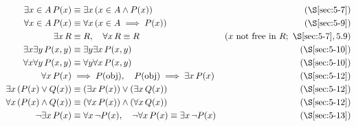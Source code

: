 \begin{note}
\begin{align*}
\exists x\in A\, P(x) &\equiv \exists x\,(x\in A \wedge P(x)) & \text{(\S\ref{sec:5-7})}\\
\forall x\in A\, P(x) &\equiv \forall x\,(x\in A \implies P(x)) & \text{(\S\ref{sec:5-9})}\\
\exists x\, R &\equiv R, \quad \forall x\, R \equiv R & (x \text{ not free in } R;\ \S\ref{sec:5-7},5.9)\\
\exists x\exists y\, P(x,y) &\equiv \exists y\exists x\, P(x,y) & \text{(\S\ref{sec:5-10})}\\
\forall x\forall y\, P(x,y) &\equiv \forall y\forall x\, P(x,y) & \text{(\S\ref{sec:5-10})}\\
\forall x\, P(x) &\implies P(\mathrm{obj}), \quad P(\mathrm{obj}) \implies \exists x\, P(x) & \text{(\S\ref{sec:5-12})}\\
\exists x\,(P(x)\vee Q(x)) &\equiv (\exists x\,P(x))\vee(\exists x\,Q(x)) & \text{(\S\ref{sec:5-12})}\\
\forall x\,(P(x)\wedge Q(x)) &\equiv (\forall x\,P(x))\wedge(\forall x\,Q(x)) & \text{(\S\ref{sec:5-12})}\\
\neg\exists x\, P(x) &\equiv \forall x\,\neg P(x), \quad \neg\forall x\, P(x) \equiv \exists x\,\neg P(x) & \text{(\S\ref{sec:5-13})}
\end{align*}
\end{note}

